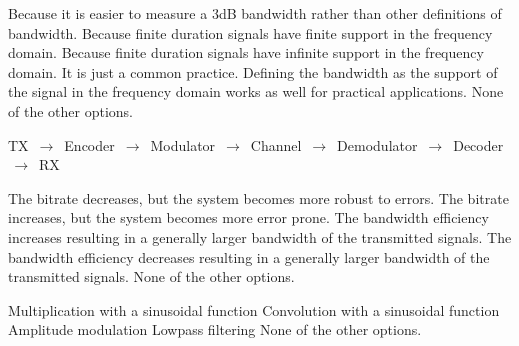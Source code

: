 \begin{questions}

    \begin{checkboxes}
        \choice Because it is easier to measure a 3dB bandwidth rather than other definitions of bandwidth.
        \CorrectChoice Because finite duration signals have finite support in the frequency domain.
        \choice Because finite duration signals have infinite support in the frequency domain.
        \choice It is just a common practice. Defining the bandwidth as the support of the signal in the frequency domain works as well for practical
        applications.
        \choice None of the other options.
    \end{checkboxes}



    \begin{solution}
        TX $\,\to\,$ Encoder $\,\to\,$ Modulator  $\,\to\,$ Channel  $\,\to\,$ Demodulator  $\,\to\,$ Decoder  $\,\to\,$ RX
    \end{solution}

    \begin{checkboxes}
        \choice The bitrate decreases, but the system becomes more robust to errors.
        \CorrectChoice The bitrate increases, but the system becomes more error prone.
        \choice The bandwidth efficiency increases resulting in a generally larger bandwidth of the transmitted signals.
        \choice The bandwidth efficiency decreases resulting in a generally larger bandwidth of the transmitted signals.
        \choice None of the other options.
    \end{checkboxes}

    \begin{checkboxes}
        \CorrectChoice Multiplication with a sinusoidal function
        \choice Convolution with a sinusoidal function
        \choice Amplitude modulation
        \choice Lowpass filtering
        \choice None of the other options.
    \end{checkboxes}


\end{questions}
